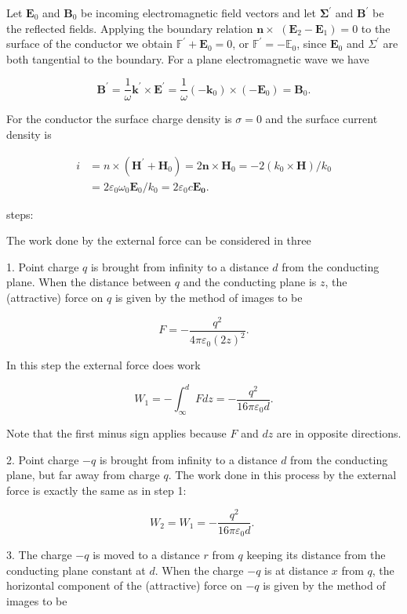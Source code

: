 \documentclass[10pt]{article}
\begin{document}
 Let $\mathbf{E}_{0}$ and $\mathbf{B}_{0}$ be incoming electromagnetic field vectors and let $\mathbf{\Sigma}^{\prime}$ and $\boldsymbol{B}^{\prime}$ be the reflected fields. Applying the boundary relation $\mathbf{n} \times$ $\left(\mathbf{E}_{2}-\mathbf{E}_{1}\right)=0$ to the surface of the conductor we obtain $\mathbb{F}^{\prime}+\mathbf{E}_{0}=0$, or $\mathbb{F}^{\prime}=-\mathbb{E}_{0}$, since $\mathbf{E}_{0}$ and $\mathcal{\Sigma}^{\prime}$ are both tangential to the boundary. For a plane electromagnetic wave we have

$$
\mathbf{B}^{\prime}=\frac{1}{\omega} \mathbf{k}^{\prime} \times \mathbf{E}^{\prime}=\frac{1}{\omega}\left(-\mathbf{k}_{0}\right) \times\left(-\mathbf{E}_{0}\right)=\mathbf{B}_{0} .
$$

For the conductor the surface charge density is $\sigma=0$ and the surface current density is

$$
\begin{aligned}
i &=n \times\left(\mathbf{H}^{\prime}+\mathbf{H}_{0}\right)=2 \mathbf{n} \times \mathbf{H}_{0}=-2\left(k_{0} \times \mathbf{H}\right) / k_{0} \\
&=2 \varepsilon_{0} \omega_{0} \mathbf{E}_{0} / k_{0}=2 \varepsilon_{0} c \mathbf{\mathbf { E } _ { 0 }} .
\end{aligned}
$$

steps:

 The work done by the external force can be considered in three

1. Point charge $q$ is brought from infinity to a distance $d$ from the conducting plane. When the distance between $q$ and the conducting plane is $z$, the (attractive) force on $q$ is given by the method of images to be

$$
F=-\frac{q^{2}}{4 \pi \varepsilon_{0}(2 z)^{2}} .
$$

In this step the external force does work

$$
W_{1}=-\int_{\infty}^{d} F d z=-\frac{q^{2}}{16 \pi \varepsilon_{0} d} .
$$

Note that the first minus sign applies because $F$ and $d z$ are in opposite directions.

2. Point charge $-q$ is brought from infinity to a distance $d$ from the conducting plane, but far away from charge $q$. The work done in this process by the external force is exactly the same as in step 1:

$$
W_{2}=W_{1}=-\frac{q^{2}}{16 \pi \varepsilon_{0} d} \text {. }
$$

3. The charge $-q$ is moved to a distance $r$ from $q$ keeping its distance from the conducting plane constant at $d$. When the charge $-q$ is at distance $x$ from $q$, the horizontal component of the (attractive) force on $-q$ is given by the method of images to be
\end{document}
